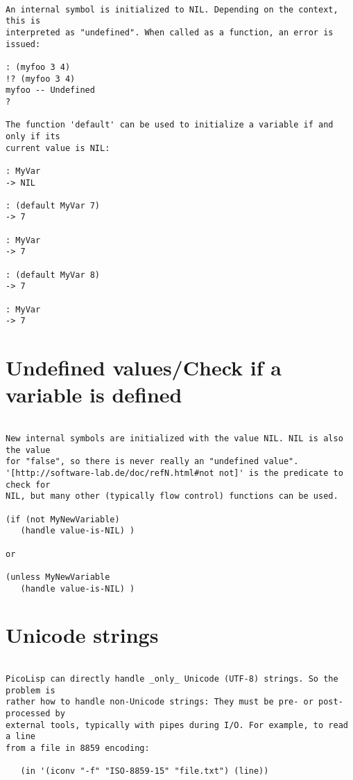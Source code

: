 \begin{verbatim}

An internal symbol is initialized to NIL. Depending on the context, this is
interpreted as "undefined". When called as a function, an error is issued:

: (myfoo 3 4)
!? (myfoo 3 4)
myfoo -- Undefined
?

The function 'default' can be used to initialize a variable if and only if its
current value is NIL:

: MyVar
-> NIL

: (default MyVar 7)
-> 7

: MyVar
-> 7

: (default MyVar 8)
-> 7

: MyVar
-> 7

\end{verbatim}

\section*{Undefined values/Check if a variable is defined}

\begin{verbatim}

New internal symbols are initialized with the value NIL. NIL is also the value
for "false", so there is never really an "undefined value".
'[http://software-lab.de/doc/refN.html#not not]' is the predicate to check for
NIL, but many other (typically flow control) functions can be used.

(if (not MyNewVariable)
   (handle value-is-NIL) )

or

(unless MyNewVariable
   (handle value-is-NIL) )

\end{verbatim}

\section*{Unicode strings}

\begin{verbatim}

PicoLisp can directly handle _only_ Unicode (UTF-8) strings. So the problem is
rather how to handle non-Unicode strings: They must be pre- or post-processed by
external tools, typically with pipes during I/O. For example, to read a line
from a file in 8859 encoding:

   (in '(iconv "-f" "ISO-8859-15" "file.txt") (line))

\end{verbatim}

